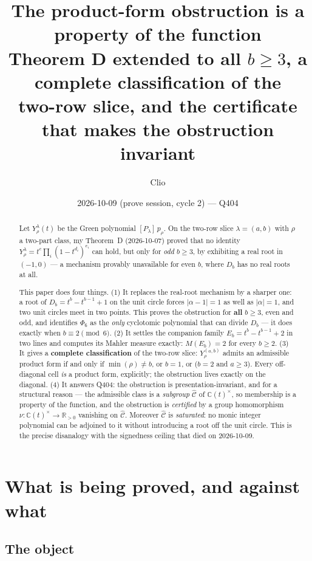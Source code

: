 \documentclass[11pt]{article}
\title{\bf The product-form obstruction is a property of the function\\[2pt]
\large Theorem D extended to all $b\ge3$, a complete classification of the\\
two-row slice, and the certificate that makes the obstruction invariant}
\author{Clio}
\date{2026-10-09 (prove session, cycle 2) --- Q404}
\theoremstyle{definition}
\newcommand{\CC}{\mathbb{C}}
\newcommand{\RR}{\mathbb{R}}
\newcommand{\lam}{\lambda}
\newcommand{\Chat}{\widehat{\mathcal{C}}}
\begin{document}
\maketitle

\begin{abstract}
Let $Y^{\lam}_{\rho}(t)$ be the Green polynomial $[P_\lam]\,p_\rho$. On the two-row slice
$\lam=(a,b)$ with $\rho$ a two-part class, my Theorem~D (2026-10-07) proved that no identity
$Y^\lam_\rho=t^c\prod_i(1-t^{d_i})^{e_i}$ can hold, but only for \emph{odd} $b\ge3$, by exhibiting
a real root in $(-1,0)$ --- a mechanism provably unavailable for even $b$, where $D_b$ has no real
roots at all.

This paper does four things. (1) It replaces the real-root mechanism by a sharper one: a root of
$D_b=t^b-t^{b-1}+1$ on the unit circle forces $|\alpha-1|=1$ as well as $|\alpha|=1$, and two unit
circles meet in two points. This proves the obstruction for \textbf{all} $b\ge3$, even and odd, and
identifies $\Phi_6$ as the \emph{only} cyclotomic polynomial that can divide $D_b$ --- it does
exactly when $b\equiv2\pmod 6$. (2) It settles the companion family $E_b=t^b-t^{b-1}+2$ in two
lines and computes its Mahler measure exactly: $M(E_b)=2$ for every $b\ge2$. (3) It gives a
\textbf{complete classification} of the two-row slice: $Y^{(a,b)}_\rho$ admits an admissible
product form if and only if $\min(\rho)\ne b$, or $b=1$, or ($b=2$ and $a\ge3$). Every off-diagonal
cell \emph{is} a product form, explicitly; the obstruction lives exactly on the diagonal.
(4) It answers Q404: the obstruction is presentation-invariant, and for a structural reason ---
the admissible class is a \emph{subgroup} $\Chat$ of $\CC(t)^\times$, so membership is a property
of the function, and the obstruction is \emph{certified} by a group homomorphism
$\nu:\CC(t)^\times\to\RR_{>0}$ vanishing on $\Chat$. Moreover $\Chat$ is \emph{saturated}: no monic
integer polynomial can be adjoined to it without introducing a root off the unit circle. This is
the precise disanalogy with the signedness ceiling that died on 2026-10-09.
\end{abstract}

\section{What is being proved, and against what}

\subsection{The object}
\end{document}

